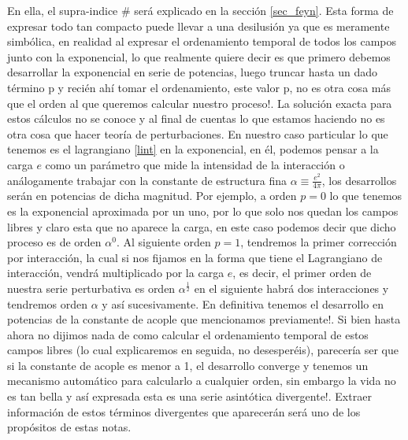 \documentclass{article}
\numberwithin{equation}{section}
\begin{document}

En ella, el supra-indice $ \# $ será explicado en la sección \ref{sec_feyn}. Esta forma de expresar todo tan compacto puede llevar a una desilusión ya que es meramente simbólica, en realidad al expresar
el ordenamiento temporal de todos los campos junto con la exponencial,
lo que realmente quiere decir es que primero debemos desarrollar la
exponencial en serie de potencias, luego truncar hasta un dado término
p y recién ahí tomar el ordenamiento, este valor p, no es otra cosa más que el orden al que queremos
calcular nuestro proceso!. La solución exacta para estos cálculos no se conoce y al final de cuentas lo que estamos haciendo no es otra cosa que hacer teoría de perturbaciones. En nuestro caso particular lo que tenemos es el lagrangiano \ref{lint} en la exponencial, en él, podemos pensar a la carga $ e $ como un parámetro que mide la intensidad de la interacción o análogamente trabajar con la constante de estructura fina $\alpha\equiv$$\frac{e^{2}}{4\pi}$, los desarrollos serán en potencias de dicha magnitud. Por ejemplo, a orden $p=0$ lo que tenemos es la exponencial aproximada por un uno, por lo que solo nos quedan los campos libres y claro esta que no aparece la carga, en este caso podemos decir que dicho proceso es de orden $\alpha^{0}$. Al
siguiente orden $p=1$, tendremos la primer corrección por interacción,
la cual si nos fijamos en la forma que tiene el Lagrangiano de interacción, vendrá multiplicado
por la carga $ e $, es decir, el primer orden de nuestra serie perturbativa
es orden $\alpha^{\frac{1}{2}}$ en el siguiente habrá dos interacciones
y tendremos orden $\alpha$ y así sucesivamente. En definitiva tenemos
el desarrollo en potencias de la constante de acople que mencionamos
previamente!. Si bien hasta ahora no dijimos nada de como calcular
el ordenamiento temporal de estos campos libres (lo cual explicaremos
en seguida, no desesperéis), parecería ser que si la constante de
acople es menor a 1, el desarrollo converge y tenemos un mecanismo
automático para calcularlo a cualquier orden, sin embargo la vida
no es tan bella y así expresada esta es una serie asintótica divergente!.
Extraer información de estos términos divergentes que aparecerán será
uno de los propósitos de estas notas. 
\end{document}
